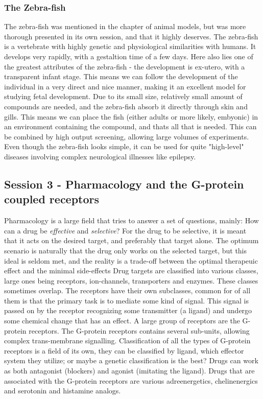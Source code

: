 \documentclass[12p]{article}
\begin{document}
\subsubsection*{The Zebra-fish}

The zebra-fish was mentioned in the chapter of animal models, but was more thorough presented in its own session, and that it highly deserves.
The zebra-fish is a vertebrate with highly genetic and physiological similarities with humans.
It develops very rapidly, with a gestaltion time of a few days.
Here also lies one of the greatest attributes of the zebra-fish - the development is ex-utero, with a transparent infant stage.
This means we can follow the development of the individual in a very direct and nice manner, making it an excellent model for studying fetal development.
Due to its small size, relatively small amount of compounds are needed, and the zebra-fish absorb it directly through skin and gills.
This means we can place the fish (either adults or more likely, embyonic) in an environment containing the compound, and thats all that is needed.
This can be combined by high output screening, allowing large volumes of experiments.
Even though the zebra-fish looks simple, it can be used for quite "high-level" diseases involving complex neurological illnesses like epilepsy.

\subsection*{Session 3 - Pharmacology and the G-protein coupled receptors}

Pharmacology is a large field that tries to answer a set of questions, mainly: How can a drug be \emph{effective} and \emph{selective}?
For the drug to be selective, it is meant that it acts on the desired target, and preferably that target alone.
The optimum scenario is naturally that the drug only works on the selected target, but this ideal is seldom met, and the reality is a trade-off between the optimal therapeuic effect and the minimal side-effects
Drug targets are classified into various classes, large ones being receptors, ion-channels, transporters and enzymes. 
These classes sometimes overlap.
The receptors have their own subclasses, common for of all them is that the primary task is to mediate some kind of signal.
This signal is passed on by the receptor recognizing some transmitter (a ligand) and undergo some chemical change that has an effect.
A large group of receptors are the G-protein receptors.
The G-protein receptors contains several sub-units, allowing complex trans-membrane signalling.
Classification of all the types of G-protein receptors is a field of its own, they can be classified by ligand, which effector system they utilize; or maybe a genetic classification is the best?
Drugs can work as both antagonist (blockers) and agonist (imitating the ligand).
Drugs that are associated with the G-protein receptors are various adreenergetics, chelinenergics and serotonin and histamine analogs.
\end{document}
